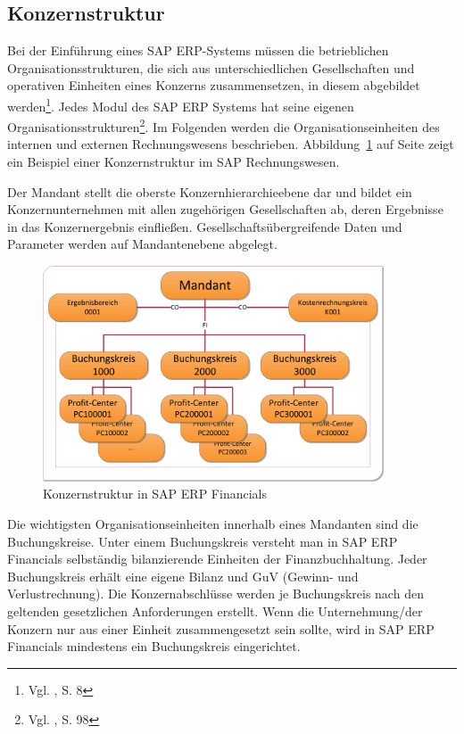 \subsection{Konzernstruktur}
Bei der Einführung eines SAP ERP-Systems müssen die betrieblichen Organisationsstrukturen, die sich aus unterschiedlichen Gesellschaften und operativen Einheiten eines Konzerns zusammensetzen, in diesem abgebildet werden\footnote{Vgl. \cite{Jacob2008}, S. 8}.
Jedes Modul des SAP ERP Systems hat seine eigenen Organisationsstrukturen\footnote{Vgl. \cite{Klein2010}, S. 98}. Im Folgenden werden die Organisationseinheiten des internen und externen Rechnungswesens beschrieben. Abbildung~\ref{abb2} auf Seite \pageref{abb2} zeigt ein Beispiel einer Konzernstruktur im SAP Rechnungswesen.

Der Mandant stellt die oberste Konzernhierarchieebene dar und bildet ein Konzernunternehmen mit allen zugehörigen Gesellschaften ab, deren Ergebnisse in das Konzernergebnis einfließen. Gesellschaftsübergreifende Daten und Parameter werden auf Mandantenebene abgelegt.
\begin{figure}[htbp]
\begin{center}
\includegraphics[width=0.9\textwidth]{Images/konzernStruktur.png}

   \caption[Konzernstruktur in SAP ERP Financials]{Konzernstruktur in SAP ERP Financials}\label{abb2}
\end{center}
\end{figure}\noindent
Die wichtigsten Organisationseinheiten innerhalb eines Mandanten sind die Buchungskreise. Unter einem Buchungskreis versteht man in SAP ERP Financials selbständig bilanzierende Einheiten der Finanzbuchhaltung. Jeder Buchungskreis erhält eine eigene Bilanz und GuV (Gewinn- und Verlustrechnung). Die Konzernabschlüsse werden je Buchungskreis nach den geltenden gesetzlichen Anforderungen erstellt. Wenn die Unternehmung/der Konzern nur aus einer Einheit zusammengesetzt sein sollte, wird in SAP ERP Financials mindestens ein Buchungskreis eingerichtet.
